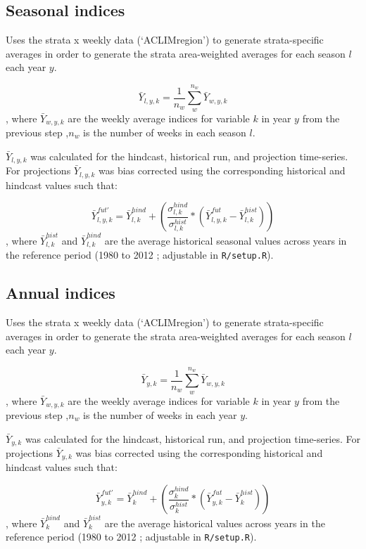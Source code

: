 \documentclass[
]{article}
\begin{document}
\hypertarget{seasonal-indices}{%
\subsection{Seasonal indices}\label{seasonal-indices}}

Uses the strata x weekly data (`ACLIMregion') to generate
strata-specific averages in order to generate the strata area-weighted
averages for each season \(l\) each year \(y\).

\[\bar{Y}_{l,y,k}= \frac{1}{n_w}\sum^{n_w}_{w}\bar{Y}_{w,y,k}\], where
\(\bar{Y}_{w,y,k}\) are the weekly average indices for variable \(k\) in
year \(y\) from the previous step ,\(n_w\) is the number of weeks in
each season \(l\).

\(\bar{Y}_{l,y,k}\) was calculated for the hindcast, historical run, and
projection time-series. For projections \(\bar{Y}_{l,y,k}\) was bias
corrected using the corresponding historical and hindcast values such
that:

\[\bar{Y}^{fut'}_{l,y,k} =\bar{Y}^{hind}_{l,k} +\left( \frac{\sigma^{hind}_{l,k}}{\sigma^{hist}_{l,k}}*(\bar{Y}^{fut}_{l,y,k}-\bar{Y}^{hist}_{l,k})  \right )\],
where \(\bar{Y}^{hist}_{l,k}\) and \(\bar{Y}^{hind}_{l,k}\) are the
average historical seasonal values across years in the reference period
(1980 to 2012 ; adjustable in \texttt{R/setup.R}).

\hypertarget{annual-indices}{%
\subsection{Annual indices}\label{annual-indices}}

Uses the strata x weekly data (`ACLIMregion') to generate
strata-specific averages in order to generate the strata area-weighted
averages for each season \(l\) each year \(y\).

\[\bar{Y}_{y,k}= \frac{1}{n_w}\sum^{n_w}_{w}\bar{Y}_{w,y,k}\], where
\(\bar{Y}_{w,y,k}\) are the weekly average indices for variable \(k\) in
year \(y\) from the previous step ,\(n_w\) is the number of weeks in
each year \(y\).

\(\bar{Y}_{y,k}\) was calculated for the hindcast, historical run, and
projection time-series. For projections \(\bar{Y}_{y,k}\) was bias
corrected using the corresponding historical and hindcast values such
that:

\[\bar{Y}^{fut'}_{y,k} =\bar{Y}^{hind}_{k} +\left( \frac{\sigma^{hind}_{k}}{\sigma^{hist}_{k}}*(\bar{Y}^{fut}_{y,k}-\bar{Y}^{hist}_{k})  \right )\],
where \(\bar{Y}^{hind}_{k}\) and \(\bar{Y}^{hist}_{k}\) are the average
historical values across years in the reference period (1980 to 2012 ;
adjustable in \texttt{R/setup.R}).
\end{document}
